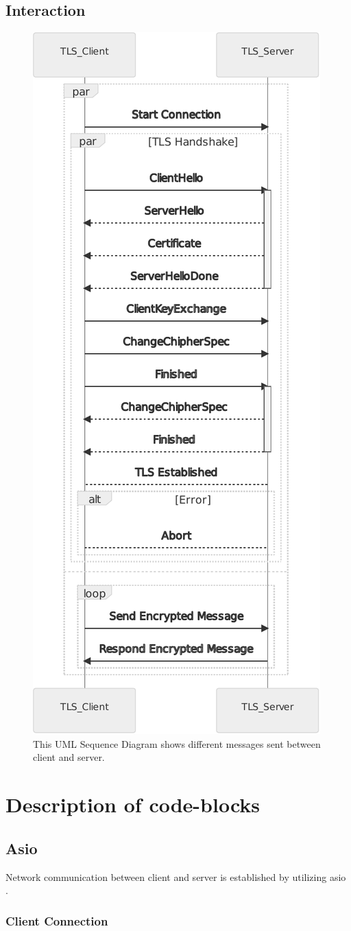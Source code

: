 \documentclass[12pt, letterpaper]{article}
\begin{document}
\subsection{Interaction}

\begin{figure}[H]
	\centering
	\includegraphics[width=.5\textwidth]{UML/Interaction}
	\caption{This UML Sequence Diagram shows different messages sent between client and server.}
	\label{fig:Interaction}
\end{figure}


\section{Description of code-blocks}


\subsection{Asio}
Network communication between client and server is established by utilizing asio \cite{asio}.

\subsubsection{Client Connection}
\end{document}
